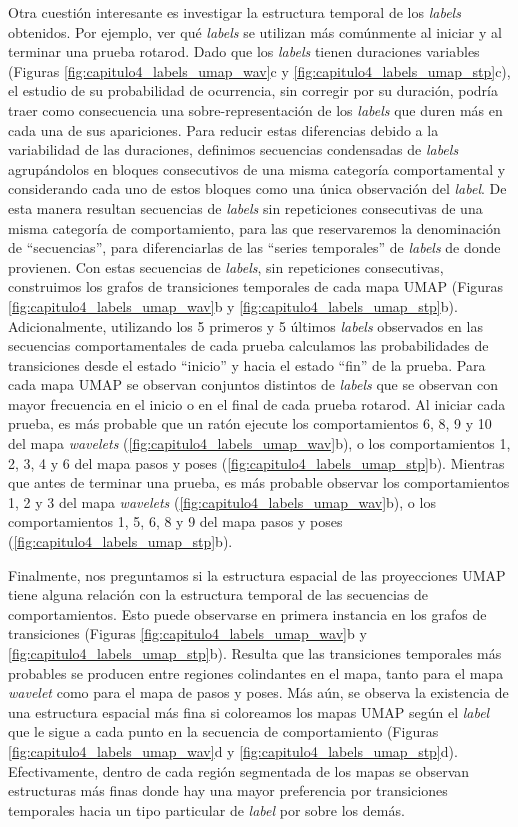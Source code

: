 Otra cuestión interesante es investigar la estructura temporal de los \textit{labels} obtenidos. Por ejemplo, ver qué \textit{labels} se utilizan más comúnmente al iniciar y al terminar una prueba rotarod. Dado que los \textit{labels} tienen duraciones variables (Figuras \ref{fig:capitulo4_labels_umap_wav}c y \ref{fig:capitulo4_labels_umap_stp}c), el estudio de su probabilidad de ocurrencia, sin corregir por su duración, podría traer como consecuencia una sobre-representación de los \textit{labels} que duren más en cada una de sus apariciones. Para reducir estas diferencias debido a la variabilidad de las duraciones, definimos secuencias condensadas de \textit{labels} agrupándolos en bloques consecutivos de una misma categoría comportamental y considerando cada uno de estos bloques como una única observación del \textit{label}. De esta manera resultan secuencias de \textit{labels} sin repeticiones consecutivas de una misma categoría de comportamiento, para las que reservaremos la denominación de ``secuencias'', para diferenciarlas de las ``series temporales'' de \textit{labels} de donde provienen. Con estas secuencias de \textit{labels}, sin repeticiones consecutivas, construimos los grafos de transiciones temporales de cada mapa UMAP (Figuras \ref{fig:capitulo4_labels_umap_wav}b y \ref{fig:capitulo4_labels_umap_stp}b). Adicionalmente, utilizando los 5 primeros y 5 últimos \textit{labels} observados en las secuencias comportamentales de cada prueba calculamos las probabilidades de transiciones desde el estado ``inicio'' y hacia el estado ``fin'' de la prueba. Para cada mapa UMAP se observan conjuntos distintos de \textit{labels} que se observan con mayor frecuencia en el inicio o en el final de cada prueba rotarod. Al iniciar cada prueba, es más probable que un ratón ejecute los comportamientos 6, 8, 9 y 10 del mapa \textit{wavelets} (\autoref{fig:capitulo4_labels_umap_wav}b), o los comportamientos 1, 2, 3, 4 y 6 del mapa pasos y poses (\autoref{fig:capitulo4_labels_umap_stp}b). Mientras que antes de terminar una prueba, es más probable observar los comportamientos 1, 2 y 3 del mapa \textit{wavelets} (\autoref{fig:capitulo4_labels_umap_wav}b), o los comportamientos 1, 5, 6, 8 y 9 del mapa pasos y poses (\autoref{fig:capitulo4_labels_umap_stp}b).

Finalmente, nos preguntamos si la estructura espacial de las proyecciones UMAP tiene alguna relación con la estructura temporal de las secuencias de comportamientos. Esto puede observarse en primera instancia en los grafos de transiciones (Figuras \ref{fig:capitulo4_labels_umap_wav}b y \ref{fig:capitulo4_labels_umap_stp}b). Resulta que las transiciones temporales más probables se producen entre regiones colindantes en el mapa, tanto para el mapa \textit{wavelet} como para el mapa de pasos y poses. Más aún, se observa la existencia de una estructura espacial más fina si coloreamos los mapas UMAP según el \textit{label} que le sigue a cada punto en la secuencia de comportamiento (Figuras \ref{fig:capitulo4_labels_umap_wav}d y \ref{fig:capitulo4_labels_umap_stp}d). Efectivamente, dentro de cada región segmentada de los mapas se observan estructuras más finas donde hay una mayor preferencia por transiciones temporales hacia un tipo particular de \textit{label} por sobre los demás.

